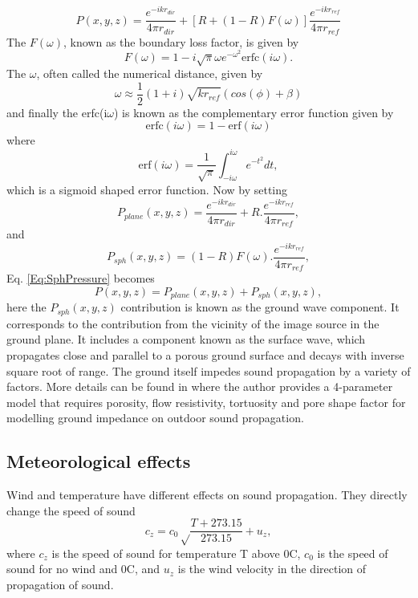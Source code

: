 \begin{equation}
    P(x,y,z)=\frac{e^{-ikr_{dir}}}{4\pi r_{dir}} + [R + (1-R)F(\omega)]\frac{e^{-ikr_{ref}}}{4\pi r_{ref}}
    \label{Eq:SphPressure}
\end{equation}
The $F(\omega)$, known as the boundary loss factor, is given by
\begin{equation}
    F(\omega)=1-i\sqrt{\pi}\omega e^{-\omega^2}\text{erfc}(i\omega).
\end{equation}
The $\omega$, often called the numerical distance, given by
\begin{equation}
    \omega \approx \frac{1}{2}(1+i)\sqrt{kr_{ref}}(cos(\phi)+\beta)
\end{equation}
and finally the erfc(i$\omega$) is known as the complementary error function given by 
\begin{equation}
    \text{erfc}(i\omega) = 1-\text{erf}(i\omega)
\end{equation}
where
\begin{equation}
    \text{erf}(i\omega)=\frac{1}{\sqrt\pi}\int_{-i\omega}^{i\omega}e^{-t^2}dt,
\end{equation}
which is a sigmoid shaped error function. Now by setting
\begin{equation}
    P_{plane}(x,y,z)=\frac{e^{-ikr_{dir}}}{4\pi r_{dir}} + R.\frac{e^{-ikr_{ref}}}{4\pi r_{ref}},
\end{equation}
and 
\begin{equation}
    P_{sph}(x,y,z)=(1-R)F(\omega).\frac{e^{-ikr_{ref}}}{4\pi r_{ref}},
\end{equation}
Eq. \ref{Eq:SphPressure} becomes
\begin{equation}
    P(x,y,z)=P_{plane}(x,y,z) + P_{sph}(x,y,z),
\end{equation}
here the $P_{sph}(x,y,z)$ contribution is known as the ground wave component. It corresponds to the contribution from the vicinity of the image source in the ground plane. It includes a component known as the surface wave, which propagates close and parallel to a porous ground surface and decays with inverse square root of range.
The ground itself impedes sound propagation by a variety of factors. More details can be found in \cite{attenborough2011outdoor} where the author provides a 4-parameter model that requires porosity, flow resistivity, tortuosity and pore shape factor for modelling ground impedance on outdoor sound propagation. 

\subsection{Meteorological effects}
Wind and temperature have different effects on sound propagation. They directly change the speed of sound
\begin{equation}
    c_z = c_0\sqrt\frac{T+273.15}{273.15} + u_z,
\end{equation}
where $c_z$ is the speed of sound for temperature T above 0\degree C, $c_0$ is the speed of sound for no wind and 0\degree C, and $u_z$ is the wind velocity in the direction of propagation of sound. 

